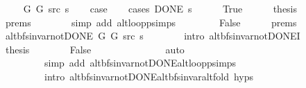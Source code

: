 \begin{isabellebody}
\ \ \isamarkupfalse%
\ {\isacharparenleft}{\kern0pt}{}\ G{}\ G{}\ src\ s{\isacharparenright}{\kern0pt}\isanewline
\ \ \isamarkupfalse%
\ {\isacharquery}{\kern0pt}case\isanewline
\ \ \isamarkupfalse%
\ {\isacharparenleft}{\kern0pt}cases\ {\isachardoublequoteopen}DONE\ s{\isachardoublequoteclose}{\isacharparenright}{\kern0pt}\isanewline
\ \ \ \ \isamarkupfalse%
\ True\isanewline
\ \ \ \ \isamarkupfalse%
\ {\isacharquery}{\kern0pt}thesis\isanewline
\ \ \ \ \ \ \isamarkupfalse%
\ {\isachardoublequoteopen}{}{\isachardot}{\kern0pt}prems{\isachardoublequoteclose}\isanewline
\ \ \ \ \ \ \isamarkupfalse%
\ {\isacharparenleft}{\kern0pt}simp\ add{\isacharcolon}{\kern0pt}\ alt{\isacharunderscore}{\kern0pt}loop{\isacharunderscore}{\kern0pt}psimps{\isacharparenright}{\kern0pt}\isanewline
\ \ \isamarkupfalse%
\isanewline
\ \ \ \ \isamarkupfalse%
\ False\isanewline
\ \ \ \ \isamarkupfalse%
\ {\isachardoublequoteopen}{}{\isachardot}{\kern0pt}prems{\isachardoublequoteclose}\isanewline
\ \ \ \ \isamarkupfalse%
\ {\isachardoublequoteopen}alt{\isacharunderscore}{\kern0pt}bfs{\isacharunderscore}{\kern0pt}invar{\isacharunderscore}{\kern0pt}not{\isacharunderscore}{\kern0pt}DONE{\isacharprime}{\kern0pt}\ G{}\ G{}\ src\ s{\isachardoublequoteclose}\isanewline
\ \ \ \ \ \ \isamarkupfalse%
\ {\isacharparenleft}{\kern0pt}intro\ alt{\isacharunderscore}{\kern0pt}bfs{\isacharunderscore}{\kern0pt}invar{\isacharunderscore}{\kern0pt}not{\isacharunderscore}{\kern0pt}DONE{\isacharprime}{\kern0pt}I{\isacharparenright}{\kern0pt}\isanewline
\ \ \ \ \isamarkupfalse%
\ {\isacharquery}{\kern0pt}thesis\isanewline
\ \ \ \ \ \ \isamarkupfalse%
\ False\isanewline
\ \ \ \ \ \ \isamarkupfalse%
\isanewline
\ \ \ \ \ \ \ \ {\isacharparenleft}{\kern0pt}auto\isanewline
\ \ \ \ \ \ \ \ \ simp\ add{\isacharcolon}{\kern0pt}\ alt{\isacharunderscore}{\kern0pt}bfs{\isacharunderscore}{\kern0pt}invar{\isacharunderscore}{\kern0pt}not{\isacharunderscore}{\kern0pt}DONE{\isachardot}{\kern0pt}alt{\isacharunderscore}{\kern0pt}loop{\isacharunderscore}{\kern0pt}psimps\isanewline
\ \ \ \ \ \ \ \ \ intro{\isacharcolon}{\kern0pt}\ alt{\isacharunderscore}{\kern0pt}bfs{\isacharunderscore}{\kern0pt}invar{\isacharunderscore}{\kern0pt}not{\isacharunderscore}{\kern0pt}DONE{\isachardot}{\kern0pt}alt{\isacharunderscore}{\kern0pt}bfs{\isacharunderscore}{\kern0pt}invar{\isacharunderscore}{\kern0pt}alt{\isacharunderscore}{\kern0pt}fold\ {\isachardoublequoteopen}{}{\isachardot}{\kern0pt}hyps{\isachardoublequoteclose}{\isacharparenright}{\kern0pt}\isanewline

\end{isabellebody}
